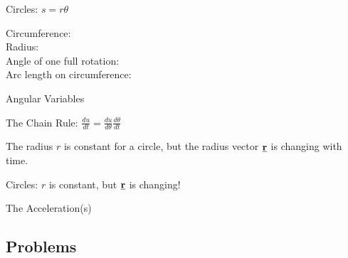 \begin{frame}{Circles: $s = r\theta$}

Circumference: \\[2ex]
Radius: \\[2ex]
Angle of one full rotation: \\[2ex]
Arc length on circumference: \\[20ex]

\end{frame}

\begin{frame}{Angular Variables}



\end{frame}



\begin{frame}{The Chain Rule: $\frac{du}{dt} = \frac{du}{d\theta} \frac{d\theta}{dt} $}

The radius $r$ is constant for a circle, but the radius vector $\underline{\mathbf{r}}$ is changing with time.\\
\vspace{20cm}





\end{frame}

%
%
%
%

\begin{frame}{Circles: $r$ is constant, but $\underline{\mathbf{r}}$ is changing!}




\end{frame}

\begin{frame}{The Acceleration(s)}




\end{frame}

%
%
%





 \subsection{Problems}
 

